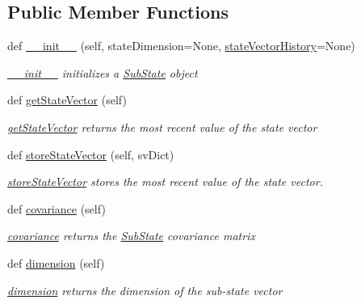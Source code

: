 \subsection*{Public Member Functions}
\begin{DoxyCompactItemize}
\item 
def \hyperlink{classSubStates_1_1SubState_a5ff829fb892680db4e3643e6b1f6cc9b}{\+\_\+\+\_\+init\+\_\+\+\_\+} (self, state\+Dimension=None, \hyperlink{classSubStates_1_1SubState_a24bf2de56fc3037d91cba43d28f3bf60}{state\+Vector\+History}=None)
\begin{DoxyCompactList}\small\item\em \hyperlink{classSubStates_1_1SubState_a5ff829fb892680db4e3643e6b1f6cc9b}{\+\_\+\+\_\+init\+\_\+\+\_\+} initializes a \hyperlink{classSubStates_1_1SubState}{Sub\+State} object \end{DoxyCompactList}\item 
def \hyperlink{classSubStates_1_1SubState_a3ebd1a120f63ed477ee76999518a8828}{get\+State\+Vector} (self)
\begin{DoxyCompactList}\small\item\em \hyperlink{classSubStates_1_1SubState_a3ebd1a120f63ed477ee76999518a8828}{get\+State\+Vector} returns the most recent value of the state vector \end{DoxyCompactList}\item 
def \hyperlink{classSubStates_1_1SubState_a65edbf44c6d93049cf0b2cb8e4b18b99}{store\+State\+Vector} (self, sv\+Dict)
\begin{DoxyCompactList}\small\item\em \hyperlink{classSubStates_1_1SubState_a65edbf44c6d93049cf0b2cb8e4b18b99}{store\+State\+Vector} stores the most recent value of the state vector. \end{DoxyCompactList}\item 
def \hyperlink{classSubStates_1_1SubState_a4d863939fdb98b2739e1e737ec7496ae}{covariance} (self)
\begin{DoxyCompactList}\small\item\em \hyperlink{classSubStates_1_1SubState_a4d863939fdb98b2739e1e737ec7496ae}{covariance} returns the \hyperlink{classSubStates_1_1SubState}{Sub\+State} covariance matrix \end{DoxyCompactList}\item 
def \hyperlink{classSubStates_1_1SubState_a4aebea19a134cb871a7c0b6c2709546a}{dimension} (self)
\begin{DoxyCompactList}\small\item\em \hyperlink{classSubStates_1_1SubState_a4aebea19a134cb871a7c0b6c2709546a}{dimension} returns the dimension of the sub-\/state vector \end{DoxyCompactList}\item 

\end{DoxyCompactItemize}
